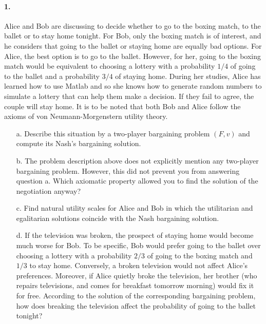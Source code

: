 \documentclass{../ape}
\begin{document}



\paragraph{1. } Alice and Bob are discussing to decide whether to go to the boxing match, to the ballet or to stay home tonight. For Bob, only the boxing match is of interest, and he considers that going to the ballet or staying home are equally bad options. For Alice, the best option is to go to the ballet. However, for her, going to the boxing match would be equivalent to choosing a lottery with a probability $1/4$ of going to the ballet and a probability $3/4$ of staying home. During her studies, Alice has learned how to use Matlab and so she knows how to generate random numbers to simulate a lottery that can help them make a decision. If they fail to agree, the couple will stay home. It is to be noted that both Bob and Alice follow the axioms of von Neumann-Morgenstern utility theory.

\begin{enumerate}
	\item[a.] Describe this situation by a two-player bargaining problem $(F,v)$ and compute its Nash's bargaining solution.
	\item[b.] The problem description above does not explicitly mention any two-player bargaining problem. However, this did not prevent you from answering question a. Which axiomatic property allowed you to find the solution of the negotiation anyway?
	\item[c.] Find natural utility scales for Alice and Bob in which the utilitarian and egalitarian solutions coincide with the Nash bargaining solution.
	\item[d.] If the television was broken, the prospect of staying home would become much worse for Bob. To be specific, Bob would prefer going to the ballet over choosing a lottery with a probability $2/3$ of going to the boxing match and $1/3$ to stay home. Conversely, a broken television would not affect Alice's preferences. Moreover, if Alice quietly broke the television, her brother (who repairs televisions, and comes for breakfast tomorrow morning) would fix it for free. According to the solution of the corresponding bargaining problem, how does breaking the television affect the probability of going to the ballet tonight?
\end{enumerate}
\end{document}
